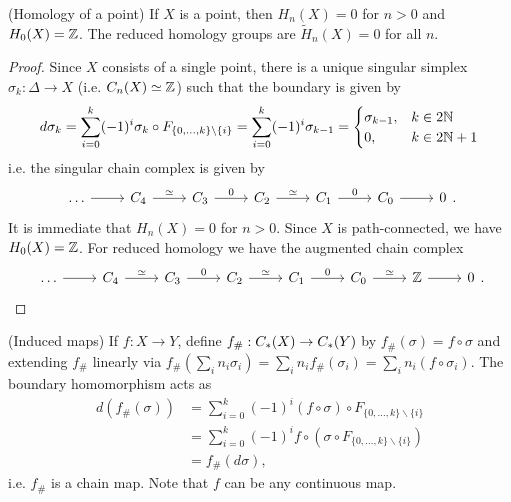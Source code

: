 \documentclass[a4paper,11pt]{article}
\begin{document}
			\begin{prop}(Homology of a point)\label{prop--hom-point}
				If $X$ is a point, then $H_{n}(X)=0$ for $n>0$ and $H_{0}(X)=\mathbb{Z}$. The reduced homology groups are $\tilde{H}_n(X)=0$ for all $n$.
			\end{prop}
			\begin{proof}
				Since $X$ consists of a single point, there is a unique singular simplex $\sigma_k:\Delta\rightarrow X$ (i.e. $C_n(X)\simeq\mathbb{Z}$) such that the boundary is given by \begin{equation}
					d\sigma_k=\sum_{i=0}^{k}(-1)^i\sigma_k\circ F_{\{0,\dots,k\}\backslash\{i\}}=\sum_{i=0}^{k}(-1)^i\sigma_{k-1}=\begin{cases}
						\sigma_{k-1}, & k\in2\mathbb{N}\\0, & k\in2\mathbb{N}+1
					\end{cases}
				\end{equation}
				i.e. the singular chain complex is given by 
				\begin{equation*}
					\begin{tikzcd}
						\dots\ar[r] & C_4\ar[r,"\simeq"] & C_3 \ar[r,"0"] & C_2 \ar[r,"\simeq"] & C_1 \ar[r,"0"] & C_0 \ar[r] & 0
					\end{tikzcd}.
				\end{equation*} 
				It is immediate that $H_n(X)=0$ for $n>0$. Since $X$ is path-connected, we have $H_0(X)=\mathbb{Z}$. For reduced homology we have the augmented chain complex
				\begin{equation*}
					\begin{tikzcd}
						\dots\ar[r] & C_4\ar[r,"\simeq"] & C_3 \ar[r,"0"] & C_2 \ar[r,"\simeq"] & C_1 \ar[r,"0"] & C_0 \ar[r,"\simeq"] & \Z\ar[r] & 0
					\end{tikzcd}.
				\end{equation*} 
			\end{proof}

			\begin{defi}(Induced maps)
				If $f:X\rightarrow Y$, define $f_\#:C_{\ast}(X) \rightarrow C_{\ast}(Y)$ by $f_\#(\sigma)=f \circ \sigma$ and extending $f_\#$ linearly via $f_\#(\sum_in_i\sigma_i)=\sum_in_if_\#(\sigma_i)=\sum_in_i(f\circ\sigma_i)$. The boundary homomorphism acts as
				\begin{align*}
					d(f_\#(\sigma))&=\sum_{i=0}^{k}(-1)^i(f \circ \sigma)\circ F_{\{0,\dots,k\}\backslash\{i\}}\\
					&=\sum_{i=0}^{k}(-1)^if \circ (\sigma\circ F_{\{0,\dots,k\}\backslash\{i\}})\\&=f_\#(d\sigma),	
				\end{align*}
				i.e. $f_\#$ is a chain map. Note that $f$ can be any continuous map.
			\end{defi}
\end{document}
